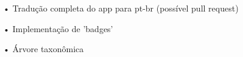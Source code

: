 

• Tradução completa do app para pt-br (possível pull request)

• Implementação de 'badges'

• Árvore taxonômica
